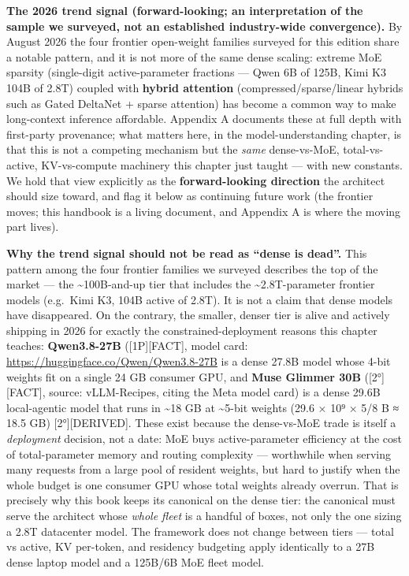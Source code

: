 \textbf{The 2026 trend signal (forward-looking; an interpretation of the
sample we surveyed, not an established industry-wide convergence).} By
August 2026 the four frontier open-weight families surveyed for this
edition share a notable pattern, and it is not more of the same dense
scaling: extreme MoE sparsity (single-digit active-parameter fractions
--- Qwen 6B of 125B, Kimi K3 104B of 2.8T) coupled with \textbf{hybrid
attention} (compressed/sparse/linear hybrids such as Gated DeltaNet +
sparse attention) has become a common way to make long-context inference
affordable. Appendix A documents these at full depth with first-party
provenance; what matters here, in the model-understanding chapter, is
that this is not a competing mechanism but the \emph{same} dense-vs-MoE,
total-vs-active, KV-vs-compute machinery this chapter just taught ---
with new constants. We hold that view explicitly as the
\textbf{forward-looking direction} the architect should size toward, and
flag it below as continuing future work (the frontier moves; this
handbook is a living document, and Appendix A is where the moving part
lives).

\textbf{Why the trend signal should not be read as ``dense is dead''.}
This pattern among the four frontier families we surveyed describes the
top of the market --- the \textasciitilde100B-and-up tier that includes
the \textasciitilde2.8T-parameter frontier models (e.g.~Kimi K3, 104B
active of 2.8T). It is not a claim that dense models have disappeared.
On the contrary, the smaller, denser tier is alive and actively shipping
in 2026 for exactly the constrained-deployment reasons this chapter
teaches: \textbf{Qwen3.8-27B} (\mbox{{[}1P{]}}\hspace{0pt}\mbox{{[}FACT{]}}, model card:
\url{https://huggingface.co/Qwen/Qwen3.8-27B} is a dense 27.8B model whose
4-bit weights fit on a single 24 GB consumer GPU, and \textbf{Muse
Glimmer 30B} (\mbox{{[}2°{]}}\hspace{0pt}\mbox{{[}FACT{]}}, source: vLLM-Recipes, citing the Meta
model card) is a dense 29.6B local-agentic model that runs in
\textasciitilde18 GB at \textasciitilde5-bit weights (29.6 × 10⁹ × 5/8 B
≈ 18.5 GB) \mbox{{[}2°{]}}\hspace{0pt}\mbox{{[}DERIVED{]}}. These exist because the dense-vs-MoE
trade is itself a \emph{deployment} decision, not a date: MoE buys
active-parameter efficiency at the cost of total-parameter memory and
routing complexity --- worthwhile when serving many requests from a
large pool of resident weights, but hard to justify when the whole
budget is one consumer GPU whose total weights already overrun. That is
precisely why this book keeps its canonical on the dense tier: the
canonical must serve the architect whose \emph{whole fleet} is a handful
of boxes, not only the one sizing a 2.8T datacenter model. The framework
does not change between tiers --- total vs active, KV per-token, and
residency budgeting apply identically to a 27B dense laptop model and a
125B/6B MoE fleet model.

